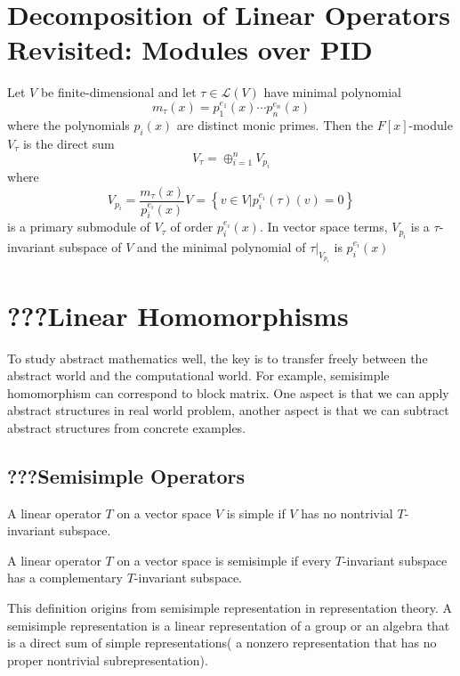 \section{Decomposition of Linear Operators Revisited: Modules over PID}
\begin{theorem}
Let $V$ be finite-dimensional and let $\tau\in\mathcal{L}(V)$  have minimal polynomial  \[m_{\tau}(x)=p_1^{e_1}(x)\cdots p_n^{e_n}(x)\]where the polynomials $p_i(x)$ are distinct monic primes. Then the $F[x]$-module $V_{\tau}$ is the direct sum \[V_{\tau}=\oplus_{i=1}^{n}V_{p_i}\]where \[V_{p_i}=\frac{m_{\tau}(x)}{p_i^{e_i}(x)}V=\left\{v\in V|p_i^{e_i}(\tau)(v)=0\right\}\]is a primary submodule of $V_\tau$ of order $p_i^{e_i}(x)$. In vector space terms, $V_{p_i}$ is a $\tau$-invariant subspace of $V$ and the minimal polynomial of $\tau|_{V_{p_i}}$ is $p_i^{e_i}(x)$
\end{theorem}




\section{???Linear Homomorphisms}
To study abstract mathematics well, the key is to transfer freely between the abstract world and the computational world. For example, semisimple homomorphism can correspond to block matrix. One aspect is that we can apply abstract structures in real world problem, another aspect is that we can subtract abstract structures from concrete examples.

\subsection{???Semisimple Operators}
\begin{definition}
A linear operator $T$ on a vector space $V$ is simple if  $V$ has no nontrivial $T$-invariant subspace.
\end{definition}
\begin{definition}
A linear operator $T$ on a vector space is semisimple if every $T$-invariant subspace has a complementary $T$-invariant subspace.
\end{definition}
\begin{remark}
This definition origins from semisimple representation in representation theory.
A semisimple representation is a linear representation of a group or an algebra that is a direct sum of simple representations( a nonzero representation that has no proper nontrivial subrepresentation).
\end{remark}


